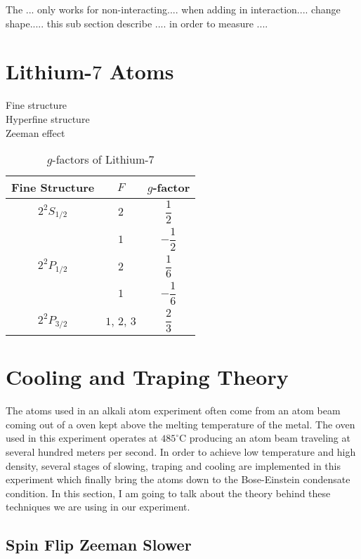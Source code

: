The ... only works for non-interacting.... when adding in interaction.... change shape..... this sub section describe .... in order to measure ....

\section{Lithium-$7$ Atoms}

Fine structure\\
Hyperfine structure\\
Zeeman effect

\begin{table}
\caption{$g$-factors of Lithium-$7$}
\label{li7:g-factors}
\begin{center}
\begin{tabular}{|c|c|c|}\hline
Fine Structure & $F$ & $g$-factor \\\hline
$2^2S_{1/2}$ & $2$ & $\dfrac 12$ \\\cline{2-3}
 & $1$ & $-\dfrac 12$ \\\hline
$2^2P_{1/2}$ & $2$ & $\dfrac 16$ \\\cline{2-3}
 & $1$ & $-\dfrac 16$ \\\hline
$2^2P_{3/2}$ & $1$, $2$, $3$ & $\dfrac 23$ \\\hline
\end{tabular}
\end{center}
\end{table}


\section{Cooling and Traping Theory}

The atoms used in an alkali atom experiment often come from an atom beam coming out of a oven kept above the melting temperature of the metal. The oven used in this experiment operates at $485^\circ\text{C}$ producing an atom beam traveling at several hundred meters per second. In order to achieve low temperature and high density, several stages of slowing, traping and cooling are implemented in this experiment which finally bring the atoms down to the Bose-Einstein condensate condition. In this section, I am going to talk about the theory behind these techniques we are using in our experiment.

\subsection{Spin Flip Zeeman Slower}\label{theory:zeeman}

